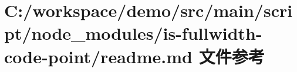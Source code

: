 \hypertarget{node__modules_2is-fullwidth-code-point_2_r_e_a_d_m_e_8md}{}\section{C\+:/workspace/demo/src/main/script/node\+\_\+modules/is-\/fullwidth-\/code-\/point/readme.md 文件参考}
\label{node__modules_2is-fullwidth-code-point_2_r_e_a_d_m_e_8md}
